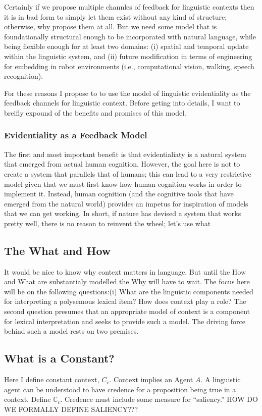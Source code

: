 \documentclass{article}
\begin{document}
Certainly if we propose multiple channles of feedback for linguistic contexts then it is in bad form to simply let them exist without any kind of structure; otherwise, why propose them at all. But we need some model that is foundationally structural enough to be incorporated with natural language, while being flexible enough for at least two domains: (i) spatial and temporal update within the linguistic system, and (ii) future modification in terms of engineering for embedding in robot environments (i.e., computational vision, walking, speech recognition). 

For these reasons I propose to to use the model of linguistic evidentiality as the feedback channels for linguistic context. Before geting into details, I want to breifly expound of the benefits and promises of this model.

\subsubsection{Evidentiality as a Feedback Model}
The first and most important benefit is that evidentialiaty is a natural system that emerged from actual human cognition. However, the goal here is not to create a system that parallels that of humans; this can lead to a very restrictive model given that we must first know how human cognition works in order to implement it. Instead, human cognition (and the cognitive tools that have emerged from the natural world) provides an impetus for inspiration of models that we can get working. In short, if nature has devised a system that works pretty well, there is no reason to reinvent the wheel; let's use what 

\subsection{The What and How}
It would be nice to know why context matters in language. But until the How and What are substantialy modelled the Why will have to wait. The focus here will be on the following questions:(i) What are the linguistic components needed for interpreting a polysemous lexical item? How does context play a role? The second question presumes that an appropriate model of context is a component for lexical interpretation and seeks to provide such a model. The driving force behind  such a model rests on two premises.

\subsection{What is a Constant?}
Here I define constant context, $C_c$. Context implies an Agent $A$. A linguistic agent can be understood to have credence for a proposition being true in a context. Define $\mathbb{C}_c$. Credence must include some measure for ``saliency.'' HOW DO WE FORMALLY DEFINE SALIENCY???
\end{document}
